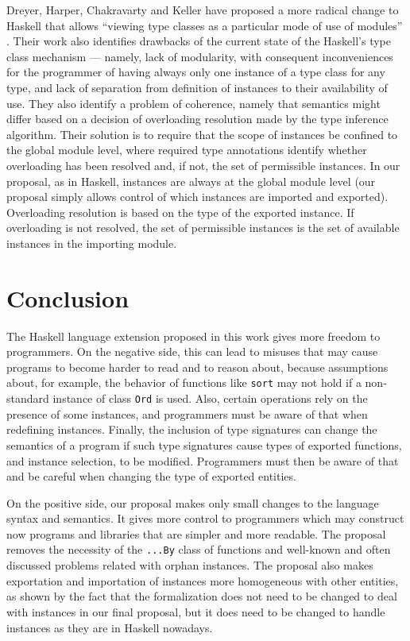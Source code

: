 \documentclass[msc]{ppgccufmg}
\begin{document}
Dreyer, Harper, Chakravarty and Keller have proposed a more radical
change to Haskell that allows ``viewing type classes as a particular
mode of use of modules'' \citep{modular}. Their work also identifies
drawbacks of the current state of the Haskell's type class mechanism
--- namely, lack of modularity, with consequent inconveniences for the
programmer of having always only one instance of a type class for any
type, and lack of separation from definition of instances to their
availability of use. They also identify a problem of coherence, namely
that semantics might differ based on a decision of overloading
resolution made by the type inference algorithm. Their solution is to
require that the scope of instances be confined to the global module
level, where required type annotations identify whether overloading
has been resolved and, if not, the set of permissible instances. In
our proposal, as in Haskell, instances are always at the global module
level (our proposal simply allows control of which instances are
imported and exported). Overloading resolution is based on the type of
the exported instance. If overloading is not resolved, the set of
permissible instances is the set of available instances in the
importing module.

\chapter{Conclusion}
\label{conclusion}

The Haskell language extension proposed in this work gives more
freedom to programmers. On the negative side, this can lead to misuses
that may cause programs to become harder to read and to reason about,
because assumptions about, for example, the behavior of functions like
\texttt{sort} may not hold if a non-standard instance of class
\texttt{Ord} is used.
Also, certain operations rely on the presence of some instances, and
programmers must be aware of that when redefining instances.  Finally,
the inclusion of type signatures can change the semantics of a program
if such type signatures cause types of exported functions, and
instance selection, to be modified. Programmers must then be aware of
that and be careful when changing the type of exported entities.

On the positive side, our proposal makes only small changes to the
language syntax and semantics. It gives more control to programmers
which may construct now programs and libraries that are simpler and
more readable.  The proposal removes the necessity of the
\texttt{...By} class of functions and well-known and often discussed
problems related with orphan instances. The proposal also makes
exportation and importation of instances more homogeneous with other
entities, as shown by the fact that the formalization does not need to
be changed to deal with instances in our final proposal, but it does
need to be changed to handle instances as they are in Haskell
nowadays.
\end{document}

